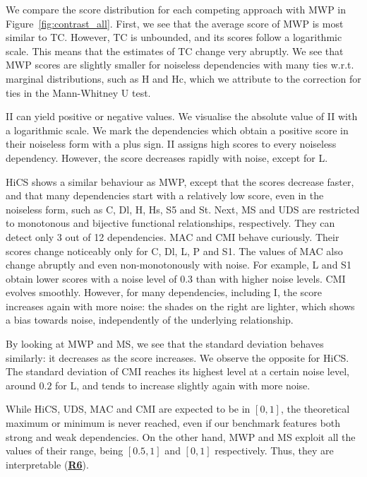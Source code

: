 We compare the score distribution for each competing approach with \gls{MWP} in Figure~\ref{fig:contrast_all}. First, we see that the average score of \gls{MWP} is most similar to \gls{TC}. However, \gls{TC} is unbounded, and its scores follow a logarithmic scale. This means that the estimates of \gls{TC} change very abruptly. We see that \gls{MWP} scores are slightly smaller for noiseless dependencies with many ties w.r.t. marginal distributions, such as H and Hc, which we attribute to the correction for ties in the Mann-Whitney U test.
 
\gls{II} can yield positive or negative values. %
We visualise the absolute value of \gls{II} with a logarithmic scale. We mark the dependencies which obtain a positive score in their noiseless form with a plus sign.
\gls{II} assigns high scores to every noiseless dependency. However, the score decreases rapidly with noise, except for L.

\gls{HiCS} shows a similar behaviour as \gls{MWP}, except that the scores decrease faster, and that many dependencies start with a relatively 
low score, even in the noiseless form, such as C, Dl, H,  Hs, S5 and St. 
Next, \gls{MS} and \gls{UDS} are restricted to monotonous and bijective functional relationships, respectively. They can detect only 3 out of 12 dependencies. \gls{MAC} and \gls{CMI} behave curiously. Their scores change noticeably only for C, Dl, L, P and S1.
The values of \gls{MAC} also change abruptly and even non-monotonously with noise. For example, L and S1 obtain lower scores with a noise level of 0.3 than with higher noise levels. 
\gls{CMI} evolves smoothly. However, for many dependencies, including I, the score increases again with more noise: the shades on the right are lighter, which shows a bias towards noise, independently of the underlying relationship.

By looking at \gls{MWP} and \gls{MS}, we see that the standard deviation behaves similarly: it decreases as the score increases. We observe the opposite for \gls{HiCS}. The standard deviation of \gls{CMI} reaches its highest level at a certain noise level, around $0.2$ for \gls{L}, and tends to increase slightly again with more noise. %

While \gls{HiCS}, \gls{UDS}, \gls{MAC} and \gls{CMI} are expected to be in $[0,1]$, the theoretical maximum or minimum is never reached, even if our benchmark features both strong and weak dependencies. On the other hand, \gls{MWP} and \gls{MS} exploit all the values of their range, being $[0.5,1]$ and $[0,1]$ respectively. Thus, they are interpretable (\hyperlink{R6}{\textbf{R6}}).

